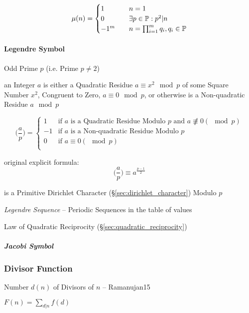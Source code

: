 \[
  \mu(n) =
  \begin{cases}
  1     & \quad n = 1 \\
  0     & \quad \exists p \in \mathbb{P} : p^2|n \\
  -1^m  & \quad n = \prod_{i = 1}^m q_i, q_i \in \mathbb{P} \\
  \end{cases}
\]



\paragraph{Legendre Symbol}\label{sec:legendre_symbol}\hfill

Odd Prime $p$ (i.e. Prime $p \neq 2$)

an Integer $a$ is either a Quadratic Residue $a \equiv x^2 \mod p$ of some
Square Number $x^2$, Congruent to Zero, $a \equiv 0 \mod p$, or otherwise is
a Non-quadratic Residue $a \mod p$

\[
  \Big(\frac{a}{p}\Big) = \begin{cases}
    1  & \text{if }a\text{ is a Quadratic Residue Modulo }p\text{ and }
          a \not\nequiv 0 (\mod p) \\
    -1 & \text{if }a\text{ is a Non-quadratic Residue Modulo }p \\
    0  & \text{if }a \equiv 0 (\mod p) \\
  \end{cases}
\]

original explicit formula:
\[
  \Big(\frac{a}{p}\Big) \equiv a^{\frac{p-1}{2}}
\]

is a Primitive Dirichlet Character (\S\ref{sec:dirichlet_character}) Modulo $p$

\emph{Legendre Sequence} -- Periodic Sequences in the table of values

\fist Law of Quadratic Reciprocity (\S\ref{sec:quadratic_reciprocity})



\subparagraph{Jacobi Symbol}\label{sec:jacobi_symbol}\hfill



\subsubsection{Divisor Function}\label{sec:divisor_function}

Number $d(n)$ of Divisors of $n$ -- Ramanujan15

$F(n) = \sum_{d|n}f(d)$

